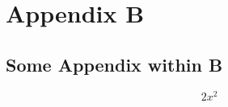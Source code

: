 \documentclass[main.tex]{subfiles}
\begin{document}
\renewcommand{\chaptername}{}
\renewcommand{\thechapter}{}
\renewcommand{\thetable}{B.\arabic{table}}
\renewcommand{\thesection}{B.\arabic{section}}
\renewcommand{\thesubsection}{B.\arabic{subsection}}
\renewcommand{\theequation}{B.\arabic{section}.\arabic{equation}}
\chapter{Appendix B}

\section{Some Appendix within B}
\begin{equation}
    2x^2
\end{equation}
\end{document}
